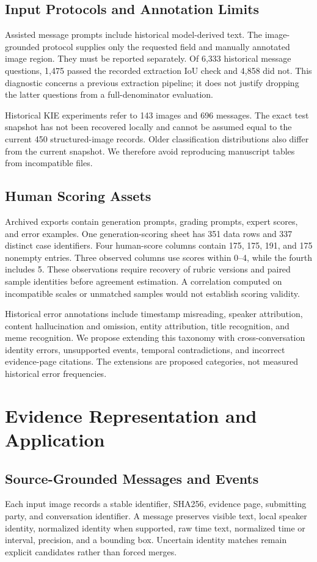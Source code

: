 \documentclass[11pt]{article}
\begin{document}
\subsection{Input Protocols and Annotation Limits}
Assisted message prompts include historical model-derived text. The image-grounded protocol supplies only the requested field and manually annotated image region. They must be reported separately. Of 6,333 historical message questions, 1,475 passed the recorded extraction IoU check and 4,858 did not. This diagnostic concerns a previous extraction pipeline; it does not justify dropping the latter questions from a full-denominator evaluation.

Historical KIE experiments refer to 143 images and 696 messages. The exact test snapshot has not been recovered locally and cannot be assumed equal to the current 450 structured-image records. Older classification distributions also differ from the current snapshot. We therefore avoid reproducing manuscript tables from incompatible files.

\subsection{Human Scoring Assets}
Archived exports contain generation prompts, grading prompts, expert scores, and error examples. One generation-scoring sheet has 351 data rows and 337 distinct case identifiers. Four human-score columns contain 175, 175, 191, and 175 nonempty entries. Three observed columns use scores within 0--4, while the fourth includes 5. These observations require recovery of rubric versions and paired sample identities before agreement estimation. A correlation computed on incompatible scales or unmatched samples would not establish scoring validity.

Historical error annotations include timestamp misreading, speaker attribution, content hallucination and omission, entity attribution, title recognition, and meme recognition. We propose extending this taxonomy with cross-conversation identity errors, unsupported events, temporal contradictions, and incorrect evidence-page citations. The extensions are proposed categories, not measured historical error frequencies.

\section{Evidence Representation and Application}
\subsection{Source-Grounded Messages and Events}
Each input image records a stable identifier, SHA256, evidence page, submitting party, and conversation identifier. A message preserves visible text, local speaker identity, normalized identity when supported, raw time text, normalized time or interval, precision, and a bounding box. Uncertain identity matches remain explicit candidates rather than forced merges.
\end{document}
